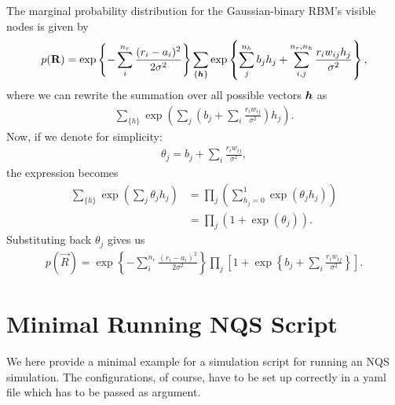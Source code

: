 The marginal probability distribution for the Gaussian-binary RBM's visible nodes is given by
\begin{align*}
p(\mathbf{R}) = \exp\left\{-\sum_i^{n_r} \frac{(r_i - a_i)^2}{2\sigma^2}\right\}\sum_{\{\boldsymbol{h}\}} \exp\left\{\sum_j^{n_h} b_j h_j +\sum_{i,j}^{n_r,{n_h}} \frac{r_i w_{ij} h_j}{\sigma^2} \right\},
\end{align*}
where we can rewrite the summation over all possible vectors $\boldsymbol{h}$ as
\begin{align*}
\sum_{\{h\}} \exp \left( \sum_{j} \left( b_j + \sum_{i} \frac{r_i w_{ij}}{\sigma^2} \right) h_j \right).
\end{align*}
Now, if we denote for simplicity:
\begin{align*}
\theta_j = b_j + \sum_{i} \frac{r_i w_{ij}}{\sigma^2},
\end{align*}
the expression becomes
\begin{align*}
\sum_{\{h\}} \exp \left( \sum_{j} \theta_j h_j \right)&= \prod_{j} \left( \sum_{h_j=0}^{1} \exp (\theta_j h_j) \right) \\
&=\prod_{j} \left( 1 + \exp (\theta_j) \right).
\end{align*}
Substituting back $\theta_j$ gives us
\begin{align*}
p(\vec{R}) = \exp\left\{-\sum_i^{n_r} \frac{(r_i - a_i)^2}{2\sigma^2}\right\}\prod_{j} \left[ 1 + \exp \left\{ b_j + \sum_{i} \frac{r_i w_{ij}}{\sigma^2} \right\} \right].
\end{align*}

\section{Minimal Running NQS Script}\label{sec:minimal_nqs}

We here provide a minimal example for a simulation script for running an NQS simulation. The configurations, of course, have to be set up correctly in a yaml file which has to be passed as argument.

